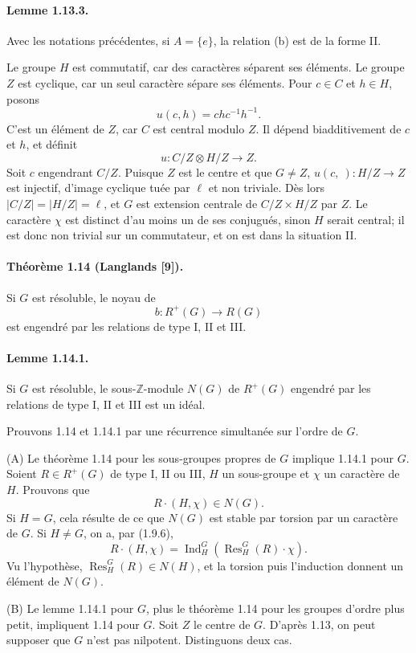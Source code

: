 \documentclass[10pt]{article}
\newcommand{\Z}{\mathbb Z}
\newcommand{\Ind}{\operatorname{Ind}}
\newcommand{\Res}{\operatorname{Res}}
\providecommand{\Ind}{\operatorname{Ind}}
\begin{document}
\paragraph{Lemme 1.13.3.} Avec les notations précédentes, si \(A=\{e\}\), la relation (b) est de la forme II.

Le groupe \(H\) est commutatif, car des caractères séparent ses éléments. Le groupe \(Z\) est cyclique, car un seul caractère sépare ses éléments. Pour \(c\in C\) et \(h\in H\), posons
\[
u(c,h)=chc^{-1}h^{-1}.
\]
C'est un élément de \(Z\), car \(C\) est central modulo \(Z\). Il dépend biadditivement de \(c\) et \(h\), et définit
\[
u:C/Z\otimes H/Z\longrightarrow Z.
\]
Soit \(c\) engendrant \(C/Z\). Puisque \(Z\) est le centre et que \(G\ne Z\), \(u(c,\ ) :H/Z\to Z\) est injectif, d'image cyclique tuée par \(\ell\) et non triviale. Dès lors \(|C/Z|=|H/Z|=\ell\), et \(G\) est extension centrale de \(C/Z\times H/Z\) par \(Z\). Le caractère \(\chi\) est distinct d'au moins un de ses conjugués, sinon \(H\) serait central; il est donc non trivial sur un commutateur, et on est dans la situation II.

\paragraph{Théorème 1.14 (Langlands [9]).} Si \(G\) est résoluble, le noyau de
\[
b:R^+(G)\longrightarrow R(G)
\]
est engendré par les relations de type I, II et III.

\paragraph{Lemme 1.14.1.} Si \(G\) est résoluble, le sous-\(\Z\)-module \(N(G)\) de \(R^+(G)\) engendré par les relations de type I, II et III est un idéal.

Prouvons 1.14 et 1.14.1 par une récurrence simultanée sur l'ordre de \(G\).

(A) Le théorème 1.14 pour les sous-groupes propres de \(G\) implique 1.14.1 pour \(G\). Soient \(R\in R^+(G)\) de type I, II ou III, \(H\) un sous-groupe et \(\chi\) un caractère de \(H\). Prouvons que
\[
R\cdot(H,\chi)\in N(G).
\]
Si \(H=G\), cela résulte de ce que \(N(G)\) est stable par torsion par un caractère de \(G\). Si \(H\ne G\), on a, par (1.9.6),
\[
R\cdot(H,\chi)=\Ind_H^G(\Res_H^G(R)\cdot\chi).
\]
Vu l'hypothèse, \(\Res_H^G(R)\in N(H)\), et la torsion puis l'induction donnent un élément de \(N(G)\).

(B) Le lemme 1.14.1 pour \(G\), plus le théorème 1.14 pour les groupes d'ordre plus petit, impliquent 1.14 pour \(G\). Soit \(Z\) le centre de \(G\). D'après 1.13, on peut supposer que \(G\) n'est pas nilpotent. Distinguons deux cas.
\end{document}
